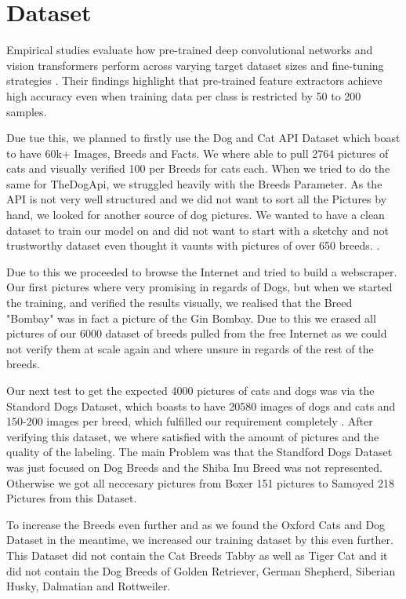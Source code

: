 \section{Dataset}
\label{sec:dataset}

Empirical studies evaluate how pre-trained deep 
convolutional networks and vision transformers 
perform across varying target dataset sizes and 
fine-tuning strategies \cite{aboubaker2022empirical}. 
Their findings highlight that pre-trained feature 
extractors achieve high accuracy even when training 
data per class is restricted by 50 to 200 samples.

Due tue this, we planned to firstly use the Dog and 
Cat API Dataset \cite{cat_api} which boast to have 60k+ Images, Breeds and Facts. We where able to pull 2764 pictures of cats
and visually verified 100 per Breeds for cats each. When we tried to do the same for TheDogApi, we struggled heavily with the Breeds Parameter.
As the API is not very well structured and we did not want to sort all the Pictures by hand, we looked for another source of dog pictures. We wanted to have a clean
dataset to train our model on and did not want to start with a sketchy and not trustworthy dataset even thought it vaunts with pictures of over 650 breeds.
\cite{thedogapi}.

Due to this we proceeded to browse the Internet and tried to build a webscraper. Our first pictures where very promising in regards of Dogs, but when we started the training, 
and verified the results visually, we realised that the Breed "Bombay" was in fact a picture of the Gin Bombay. Due to this we erased all pictures of our 6000 dataset of breeds 
pulled from the free Internet as we could not verify them at scale again and where unsure in regards of the rest of the breeds.

Our next test to get the expected 4000 pictures of cats and dogs was via the Standord Dogs Dataset, which boasts to have 20580 images of dogs and cats and 150-200 images per 
breed, which fulfilled our requirement completely \cite{khosla2011stanford}. 
After verifying this dataset, we where satisfied with the amount of pictures and the quality of the labeling. 
The main Problem was that the Standford Dogs Dataset was just focused on Dog Breeds and the Shiba Inu Breed was not represented. Otherwise we got all neccesary 
pictures from Boxer 151 pictures to Samoyed 218 Pictures 
from this Dataset. 
 
To increase the Breeds even further and as we found the Oxford Cats and Dog Dataset in the meantime, we increased our training dataset by this even further.
This Dataset did not contain the Cat Breeds Tabby as well as Tiger Cat and it did not contain the Dog Breeds of Golden Retriever, German Shepherd, Siberian Husky, Dalmatian and Rottweiler.

